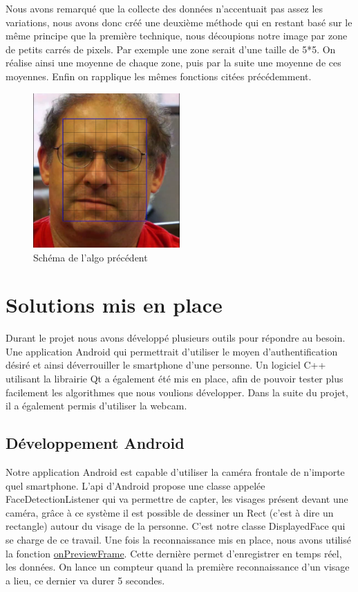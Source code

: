 Nous avons remarqué que la collecte des données n'accentuait pas assez les variations, nous avons donc créé une deuxième méthode qui en restant basé sur le même principe que la première technique, nous découpions notre image
par zone de petits carrés de pixels. Par exemple une zone serait d'une taille de 5*5. On réalise ainsi une moyenne de chaque zone, puis par la suite une moyenne de ces moyennes. Enfin on rapplique les mêmes fonctions citées précédemment.

\begin{figure}[h!]
	\centering
	\includegraphics[width=0.5\textwidth]{data/algo-schema.png}
	\caption{Schéma de l'algo précédent}
\end{figure}


\section{Solutions mis en place}

Durant le projet nous avons développé plusieurs outils pour répondre au besoin. Une application Android qui permettrait d'utiliser le moyen d'authentification désiré et ainsi déverrouiller le smartphone d'une
personne. Un logiciel C++ utilisant la librairie Qt a également été mis en place, afin de pouvoir tester plus facilement les algorithmes que nous voulions développer. Dans la suite du projet, il a également
permis d'utiliser la webcam.

\subsection{Développement Android}

	Notre application Android est capable d'utiliser la caméra frontale de n'importe quel smartphone. L'api d'Android propose une classe appelée FaceDetectionListener qui va permettre de capter, les visages
présent devant une caméra, grâce à ce système il est possible de dessiner un Rect (c'est à dire un rectangle) autour du visage de la personne. C'est notre classe DisplayedFace qui se charge de ce travail.
Une fois la reconnaissance mis en place, nous avons utilisé la fonction
\href{http://developer.android.com/reference/android/hardware/Camera.PreviewCallback.html#onPreviewFrame\%28byte\%5B\%5D,\%20android.hardware.Camera\%29}{onPreviewFrame}. Cette dernière permet d'enregistrer
en temps réel, les données. On lance un compteur quand la première reconnaissance d'un visage a lieu, ce dernier va durer 5 secondes.\\

